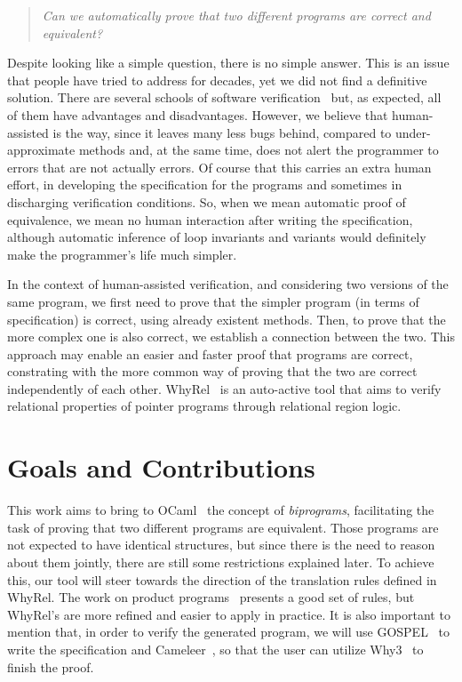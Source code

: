 \begin{quote}
    \centering
    \emph{Can we automatically prove that two different programs are correct and equivalent?}
\end{quote}

Despite looking like a simple question, there is no simple answer.
This is an issue that people have tried to address for decades, yet we did not find a definitive solution.
There are several schools of software verification~\cite{DBLP:conf/fm/BrainP24} but, as expected, all of them have advantages and disadvantages.
However, we believe that human-assisted is the way, since it leaves many less bugs behind, compared to under-approximate methods and, at the same time, does not alert the programmer to errors that are not actually errors.
Of course that this carries an extra human effort, in developing the specification for the programs and sometimes in discharging verification conditions.
So, when we mean automatic proof of equivalence, we mean no human interaction after writing the specification, although automatic inference of loop invariants and variants would definitely make the programmer's life much simpler.

In the context of human-assisted verification, and considering two versions of the same program, we first need to prove that the simpler program (in terms of specification) is correct, using already existent methods.
Then, to prove that the more complex one is also correct, we establish a connection between the two.
This approach may enable an easier and faster proof that programs are correct, constrating with the more common way of proving that the two are correct independently of each other. 
WhyRel~\cite{whyrel} is an auto-active tool that aims to verify relational properties of pointer programs through relational region logic.


\section{Goals and Contributions}

This work aims to bring to OCaml~\cite{ocaml} the concept of \emph{biprograms}, facilitating the task of proving that two different programs are equivalent.
Those programs are not expected to have identical structures, but since there is the need to reason about them jointly, there are still some restrictions explained later.
To achieve this, our tool will steer towards the direction of the translation rules defined in WhyRel.
The work on product programs~\cite{DBLP:conf/fm/BartheCK11} presents a good set of rules, but WhyRel's are more refined and easier to apply in practice.
It is also important to mention that, in order to verify the generated program, we will use GOSPEL~\cite{DBLP:conf/fm/ChargueraudFLP19} to write the specification and Cameleer~\cite{DBLP:conf/cav/PereiraR20}, so that the user can utilize Why3~\cite{why3} to finish the proof.


